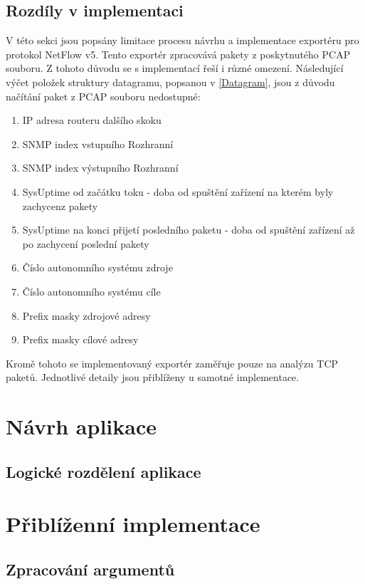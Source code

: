 \documentclass[11pt, a4paper, hidelinks]{article}[08.10.2023]
\begin{document}
    \pagebreak
    \subsection{Rozdíly v implementaci}
    V této sekci jsou popsány limitace procesu návrhu a implementace exportéru pro protokol NetFlow v5. Tento exportér 
    zpracovává pakety z poskytnutého PCAP souboru. Z tohoto důvodu se s implementací řeší i různé omezení. Následující
    výčet položek struktury datagramu, popsanou v \ref{Datagram}, jsou z důvodu načítání paket z PCAP souboru nedostupné:

    \begin{enumerate}
        \item{IP adresa routeru dalšího skoku}
        \item{SNMP index vstupního Rozhranní}
        \item{SNMP index výstupního Rozhranní}
        \item{SysUptime od začátku toku - doba od spuštění zařízení na kterém byly zachycenz pakety}
        \item{SysUptime na konci přijetí posledního paketu - doba od spuštění zařízení až po zachycení poslední pakety}
        \item{Číslo autonomního systému zdroje}
        \item{Číslo autonomního systému cíle}
        \item{Prefix masky zdrojové adresy}
        \item{Prefix masky cílové adresy}
    \end{enumerate}

    Kromě tohoto se implementovaný exportér zaměřuje pouze na analýzu TCP paketů. Jednotlivé detaily jsou přiblíženy u samotné implementace.


    \section{Návrh aplikace}
    \subsection{Logické rozdělení aplikace}

    \section{Přiblíženní implementace}
    \subsection{Zpracování argumentů}
\end{document}

